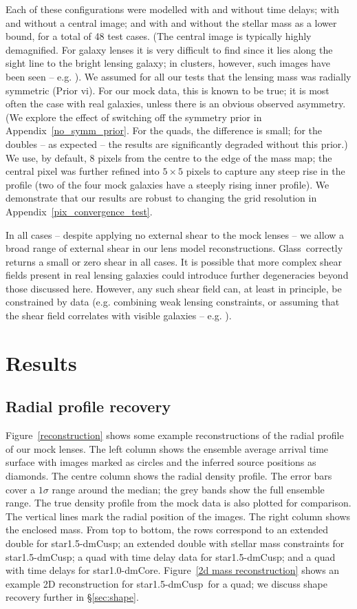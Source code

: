 \documentclass[galley,usenatbib]{mn2e}
\newcommand{\Glass}{{\sc Glass}}
\newcommand{\figref}[1] {Figure~\ref{#1}}
\newcommand{\secref}[1] {\S\ref{#1}}
\newcommand{\appref}[1] {Appendix~\ref{#1}}
\newcommand{\mockAA}{{\sc star1.0-dmCore}}
\newcommand{\mockBC}{{\sc star1.5-dmCusp}}
\begin{document}
Each of these configurations were modelled with and without time delays; with
and without a central image; and with and without the stellar mass as a lower
bound, for a total of 48 test cases. (The central image is typically highly
demagnified. For galaxy lenses it is very difficult to find since it lies along
the sight line to the bright lensing galaxy; in clusters, however, such images
have been seen -- e.g. \citealt{2005PASJ...57L...7I}). We assumed for all our
tests that the lensing mass was radially symmetric (Prior vi). For our mock
data, this is known to be true; it is most often the case with real galaxies,
unless there is an obvious observed asymmetry. (We explore the effect of
switching off the symmetry prior in \appref{no_symm_prior}. For the
quads, the difference is small; for the doubles -- as expected -- the results
are significantly degraded without this prior.) We use, by default, 8 pixels
from the centre to the edge of the mass map; the central pixel was further
refined into $5\times5$ pixels to capture any steep rise in the profile (two of
the four mock galaxies have a steeply rising inner profile). We demonstrate
that our results are robust to changing the grid resolution in 
\appref{pix_convergence_test}.

In all cases -- despite applying no external shear to the mock lenses -- we
allow a broad range of external shear in our lens model reconstructions.
\Glass\ correctly returns a small or zero shear in all cases. It is possible
that more complex shear fields present in real lensing galaxies could introduce
further degeneracies beyond those discussed here. However, any such shear field
can, at least in principle, be constrained by data (e.g. combining weak lensing
constraints, or assuming that the shear field correlates with visible galaxies
-- e.g. \citealt{2009A&A...500..681M,2011ApJ...726...84W}).

\section{Results}\label{sec:results}

\subsection{Radial profile recovery}

\figref{reconstruction} shows some example reconstructions of the radial
profile of our mock lenses. The left column shows the ensemble average arrival
time surface with images marked as circles and the inferred source positions
as diamonds. The centre column shows the radial density profile. The error
bars cover a $1\sigma$ range around the median; the grey bands show the full
ensemble range. The true density profile from the mock data is also plotted for
comparison. The vertical lines mark the radial position of the images. The
right column shows the enclosed mass. From top to bottom, the rows correspond
to an extended double for \mockBC; an extended double with stellar mass
constraints for \mockBC; a quad with time delay data for \mockBC; and a quad
with time delays for \mockAA. \figref{2d mass reconstruction} shows an example
2D reconstruction for \mockBC\ for a quad; we discuss shape recovery further in
\secref{sec:shape}.
\end{document}
